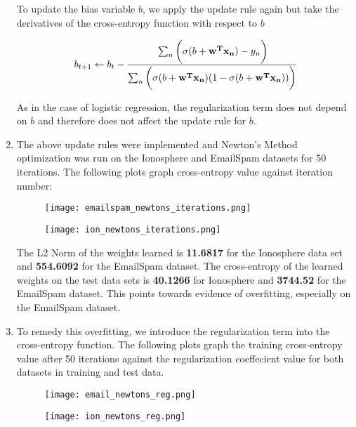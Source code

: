 \documentclass[12pt]{article}
\begin{document}
\begin{enumerate}[label=\alph*.]
	To update the bias variable $b$, we apply the update rule again but take the derivatives of the cross-entropy function with respect to $b$

	\begin{gather*}
		b_{t+1} \leftarrow b_t - \cfrac{\sum_n{\bigg( \sigma(b + \mathbf{w^T x_n}) - y_n} \bigg) }{\sum_n{ \bigg( \sigma(b + \mathbf{w^T x_n}) ( 1 - \sigma(b + \mathbf{w^T x_n}) ) \bigg) }}
	\end{gather*}

	As in the case of logistic regression, the regularization term does not depend on $b$ and therefore does not affect the update rule for $b$.

	\item The above update rules were implemented and Newton's Method optimization was run on the Ionosphere and EmailSpam datasets for 50 iterations. The following plots graph cross-entropy value against iteration number:

	\begin{figure}[bp!]
	  \centering
	    \texttt{[image: emailspam\_newtons\_iterations.png]}
	\end{figure}

	\begin{figure}[bp!]
	  \centering
	    \texttt{[image: ion\_newtons\_iterations.png]}
	\end{figure}

	The L2 Norm of the weights learned is \textbf{11.6817} for the Ionosphere data set and \textbf{554.6092} for the EmailSpam dataset. The cross-entropy of the learned weights on the test data sets is \textbf{40.1266} for Ionosphere and \textbf{3744.52} for the EmailSpam dataset. This points towards evidence of overfitting, especially on the EmailSpam dataset. 

	\item To remedy this overfitting, we introduce the regularization term into the cross-entropy function. The following plots graph the training cross-entropy value after 50 iterations against the regularization coeffecient value for both datasets in training and test data.
	
	\begin{figure}[bp!]
	  \centering
	    \texttt{[image: email\_newtons\_reg.png]}
	\end{figure}

	\begin{figure}[bp!]
	  \centering
	    \texttt{[image: ion\_newtons\_reg.png]}
	\end{figure}


\end{enumerate}
\end{document}
